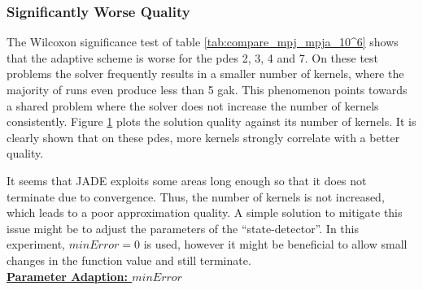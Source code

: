 \documentclass[./\jobname.tex]{subfiles}
\begin{document}
\subsubsection{Significantly Worse Quality}
\label{chap:pde 2 3 4 7} 
The Wilcoxon significance test of table \ref{tab:compare_mpj_mpja_10^6} shows that the adaptive scheme is worse for the \gls{pde}s 2, 3, 4 and 7. On these test problems the solver frequently results in a smaller number of kernels, where the majority of runs even produce less than 5 \gls{gak}. This phenomenon points towards a shared problem where the solver does not increase the number of kernels consistently. Figure \ref{fig:pajade_pde2347_kernels_l2norm} plots the solution quality against its number of kernels. It is clearly shown that on these \gls{pde}s, more kernels strongly correlate with a better quality. 
\begin{figure}[h]
	\centering
	\noindent{}
	\label{fig:pajade_pde2347_kernels_l2norm}
\end{figure}
It seems that JADE exploits some areas long enough so that it does not terminate due to convergence. Thus, the number of kernels is not increased, which leads to a poor approximation quality. A simple solution to mitigate this issue might be to adjust the parameters of the ``state-detector''. In this experiment, $minError = 0$ is used, however it might be beneficial to allow small changes in the function value and still terminate. \\
\textbf{\underline{Parameter Adaption: $minError$}} \\
\end{document}
